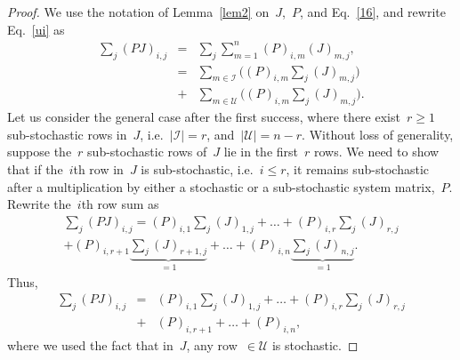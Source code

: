 \documentclass[draftclsnofoot, onecolumn, 12pt]{IEEEtran}
\begin{document}
\begin{proof}
We use the notation of Lemma~\ref{lem2} on~$J$,~$P$, and Eq.~\eqref{16}, and rewrite Eq.~\eqref{ui} as
\begin{eqnarray}
\sum_{j}(PJ)_{i,j}&=&\sum_{j}\sum_{m=1}^n(P)_{i,m}(J)_{m,j},\nonumber\\
&=& \sum_{m \in \mathcal{I}} \Bigg((P)_{i,m}\sum_{j}(J)_{m,j} \Bigg) \nonumber\\
&+& \sum_{m \in \mathcal{U}} \Bigg((P)_{i,m}{\sum_{j}(J)_{m,j}} \Bigg).
\end{eqnarray}
Let us consider the general case after the first success, where there exist~$r \geq 1$ sub-stochastic rows in~$J$, i.e.~$\vert \mathcal{I} \vert=r$, and~$\vert \mathcal{U} \vert=n-r$. Without loss of generality, suppose the~$r$ sub-stochastic rows of~$J$ lie in the first~$r$ rows. We need to show that if the~$i$th row in~$J$ is sub-stochastic, i.e.~$i\leq r$, it remains sub-stochastic after a multiplication by either a stochastic or a sub-stochastic system matrix,~$P$. Rewrite the~$i$th row sum as
\begin{eqnarray}\label{27}
\sum_{j}(PJ)_{i,j}=
(P)_{i,1}\sum_{j}(J)_{1,j}+ \ldots + (P)_{i,r}\sum_{j}(J)_{r,j}\nonumber\\
+ (P)_{i,r+1}\underbrace{\sum_{j}(J)_{r+1,j}}_{=1}+ \ldots + (P)_{i,n}\underbrace{\sum_{j}(J)_{n,j}}_{=1}\nonumber.
\end{eqnarray}
Thus,
\begin{eqnarray}
\sum_{j}(PJ)_{i,j}&=&(P)_{i,1}\sum_{j}(J)_{1,j}+ \ldots + (P)_{i,r}\sum_{j}(J)_{r,j}\nonumber\\
&+&(P)_{i,r+1}+\ldots+(P)_{i,n},
\end{eqnarray}
where we used the fact that in~$J$, any row~$\in \mathcal{U}$ is stochastic. 


\end{proof}
\end{document}
